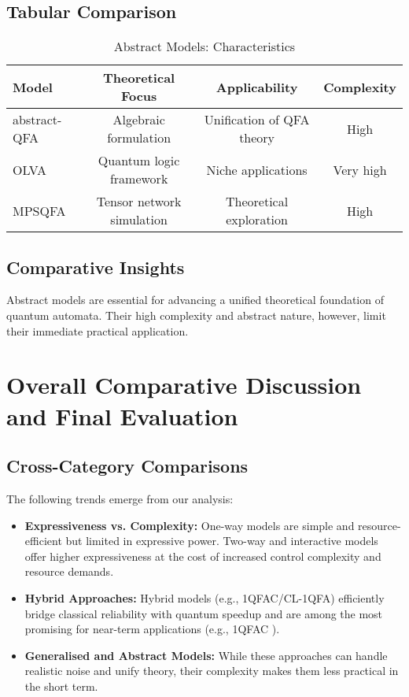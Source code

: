 \subsection{Tabular Comparison}
\begin{table}[ht]
\centering
\caption{Abstract Models: Characteristics}
\label{tab:abstract}
\begin{tabular}{|l|c|c|c|}
\hline
\textbf{Model} & \textbf{Theoretical Focus} & \textbf{Applicability} & \textbf{Complexity} \\ \hline
abstract-QFA & Algebraic formulation & Unification of QFA theory & High \\ \hline
OLVA        & Quantum logic framework & Niche applications & Very high \\ \hline
MPSQFA      & Tensor network simulation & Theoretical exploration & High \\ \hline
\end{tabular}
\end{table}

\subsection{Comparative Insights}
Abstract models are essential for advancing a unified theoretical foundation of quantum automata. Their high complexity and abstract nature, however, limit their immediate practical application.

\section{Overall Comparative Discussion and Final Evaluation}

\subsection{Cross-Category Comparisons}
The following trends emerge from our analysis:
\begin{itemize}
    \item \textbf{Expressiveness vs. Complexity:} One-way models are simple and resource-efficient but limited in expressive power. Two-way and interactive models offer higher expressiveness at the cost of increased control complexity and resource demands.
    \item \textbf{Hybrid Approaches:} Hybrid models (e.g., 1QFAC/CL-1QFA) efficiently bridge classical reliability with quantum speedup and are among the most promising for near-term applications (e.g., 1QFAC \cite{qiu2009}).
    \item \textbf{Generalised and Abstract Models:} While these approaches can handle realistic noise and unify theory, their complexity makes them less practical in the short term.
\end{itemize}

